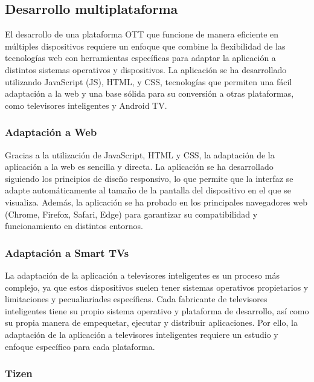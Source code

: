 \subsection{Desarrollo multiplataforma}
\label{subsec:adaptabilidad_multiplataforma}

El desarrollo de una plataforma OTT que funcione de manera eficiente en múltiples dispositivos 
requiere un enfoque que combine la flexibilidad de las tecnologías web con herramientas específicas 
para adaptar la aplicación a distintos sistemas operativos y dispositivos. La aplicación se ha 
desarrollado utilizando JavaScript (JS), HTML, y CSS, tecnologías que permiten una fácil adaptación 
a la web y una base sólida para su conversión a otras plataformas, como televisores inteligentes y Android TV.

\subsubsection{Adaptación a Web}
\label{subsubsec:adaptabilidad_web}

Gracias a la utilización de JavaScript, HTML y CSS, la adaptación de la aplicación a la web es
sencilla y directa. La aplicación se ha desarrollado siguiendo los principios de diseño responsivo,
lo que permite que la interfaz se adapte automáticamente al tamaño de la pantalla del dispositivo
en el que se visualiza. Además, la aplicación se ha probado en los principales navegadores web
(Chrome, Firefox, Safari, Edge) para garantizar su compatibilidad y funcionamiento en distintos
entornos.


\subsubsection{Adaptación a Smart TVs}
\label{subsubsec:adaptabilidad_smart_tvs}

La adaptación de la aplicación a televisores inteligentes es un proceso más complejo, ya que
estos dispositivos suelen tener sistemas operativos propietarios y limitaciones y pecualiariades
específicas. Cada fabricante de televisores inteligentes tiene su propio sistema operativo y
plataforma de desarrollo, así como su propia manera de empequetar, ejecutar y distribuir
aplicaciones. Por ello, la adaptación de la aplicación a televisores inteligentes requiere un
estudio y enfoque específico para cada plataforma. 

\subsubsection{Tizen}
\label{subsubsec:adaptabilidad_tizen}

